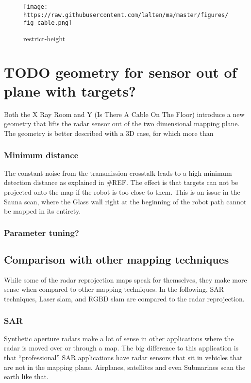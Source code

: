 \begin{figure}
\centering
\texttt{[image: https://raw.githubusercontent.com/lalten/ma/master/figures/fig\_cable.png]}
\caption{restrict-height}
\end{figure}

\section{TODO geometry for sensor out of plane with
targets?}\label{todo-geometry-for-sensor-out-of-plane-with-targets}

Both the X Ray Room and Y (Is There A Cable On The Floor) introduce a
new geometry that lifts the radar sensor out of the two dimensional
mapping plane. The geometry is better described with a 3D case, for
which more than

\subsubsection{Minimum distance}\label{minimum-distance}

The constant noise from the transmission crosstalk leads to a high
minimum detection distance as explained in \#REF. The effect is that
targets can not be projected onto the map if the robot is too close to
them. This is an issue in the Sauna scan, where the Glass wall right at
the beginning of the robot path cannot be mapped in its entirety.

\subsubsection{Parameter tuning?}\label{parameter-tuning}

\subsection{Comparison with other mapping
techniques}\label{comparison-with-other-mapping-techniques}

While some of the radar reprojection maps speak for themselves, they
make more sense when compared to other mapping techniques. In the
following, SAR techniques, Laser slam, and RGBD slam are compared to the
radar reprojection.

\subsubsection{SAR}\label{sar-1}

Synthetic aperture radars make a lot of sense in other applications
where the radar is moved over or through a map. The big difference to
this application is that ``professional'' SAR applications have radar
sensors that sit in vehicles that are not in the mapping plane.
Airplanes, satellites and even Submarines scan the earth like that.

